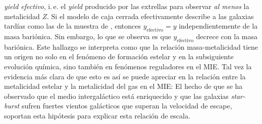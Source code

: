 \documentclass{article}
\begin{document}
\begin{description}
\emph{yield efectivo}, i.\,e. el \emph{yield} producido por las extrellas para observar \emph{al
menos} la metalicidad $Z$. Si el modelo de caja cerrada efectivamente describe a las galaxias
tardías como las de la muestra de \citeauthor{Tremonti2004}, entonces $y_\text{efectivo}=y$
independientemente de la masa bariónica. Sin embargo, lo que se observa es que $y_\text{efectivo}$
decrece con la masa bariónica.
Este hallazgo se interpreta como que la relación masa-metalicidad tiene un origen no solo en el
fenómeno de formación estelar y en la subsiguiente evolución química, sino también en fenómenos
reguladores en el MIE. Tal vez la evidencia más clara de que esto es así se puede apreciar en la
relación entre la metalicidad estelar y la metalicidad del gas en el MIE:
El hecho de que se ha observado que el medio intergaláctico está enriquecido y que las galaxias
\emph{star-burst} sufren fuertes vientos galácticos que superan la velocidad de escape, soportan
esta hipótesis para explicar esta relación de escala.


\end{description}
\end{document}
